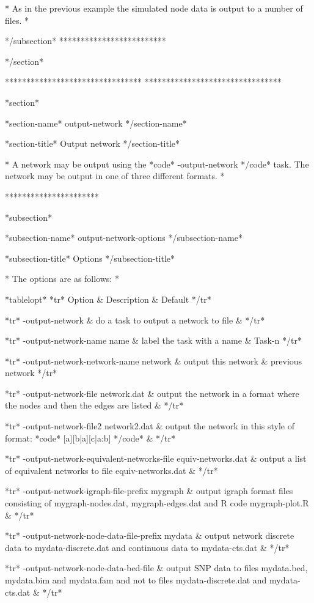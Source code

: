 * As in the previous example the simulated node data is output to a number of files. *



*/subsection* *************************

*/section*

******************************** ********************************

*section*

*section-name* output-network */section-name*

*section-title* Output network */section-title*


* A network may be output using the *code* -output-network */code* task. The network may be output in one of three different formats. *

**********************

*subsection*

*subsection-name* output-network-options */subsection-name*

*subsection-title* Options */subsection-title*

* The options are as follows: *

*tablelopt* *tr* Option & Description & Default */tr*

*tr*
 -output-network & do a task to output a network to file &
*/tr*

*tr*
  -output-network-name name & label the task with a name & Task-n
*/tr*

*tr*
  -output-network-network-name network & output this network & previous network
*/tr*

*tr*
  -output-network-file network.dat & output the network in a format where the nodes and then the edges are listed &
*/tr*

*tr*
  -output-network-file2 network2.dat & output the network in this style of format: *code* [a][b|a][c|a:b] */code* &
*/tr*

*tr* -output-network-equivalent-networks-file equiv-networks.dat & output a list of equivalent networks to file equiv-networks.dat & */tr*

*tr*
  -output-network-igraph-file-prefix mygraph & output igraph format files consisting of mygraph-nodes.dat, mygraph-edges.dat and R code mygraph-plot.R &
*/tr*

*tr* -output-network-node-data-file-prefix mydata & output network discrete data to mydata-discrete.dat and continuous data to mydata-cts.dat & */tr*

*tr* -output-network-node-data-bed-file & output SNP data to files mydata.bed, mydata.bim and mydata.fam and not to files mydata-discrete.dat and mydata-cts.dat & */tr*

